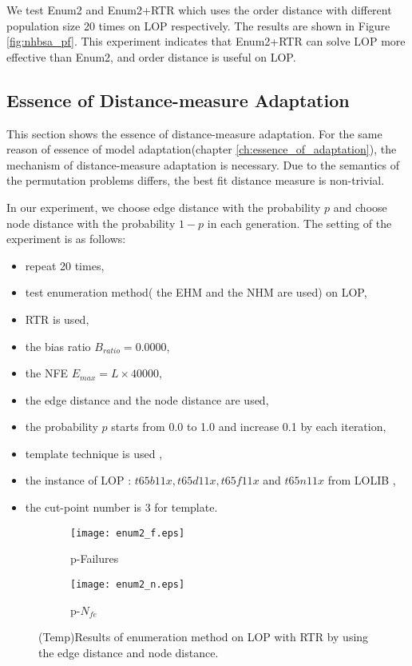 We test Enum2 and Enum2+RTR which uses the order distance with different population size 20 times on LOP respectively. The results are shown in Figure \ref{fig:nhbsa_pf}. This experiment indicates that Enum2+RTR can solve LOP more effective than Enum2, and order distance is useful on LOP.


\subsection{Essence of Distance-measure Adaptation}
This section shows the essence of distance-measure adaptation. For the same reason of essence of model adaptation(chapter \ref{ch:essence_of_adaptation}), the mechanism of distance-measure adaptation is necessary. Due to the semantics of the permutation problems differs, the best fit distance measure is non-trivial.

In our experiment, we choose edge distance with the probability $p$ and choose node distance with the probability $1-p$ in each generation. The setting of the experiment is as follows:
\begin{itemize}
    \item repeat 20 times,
    \item test enumeration method( the EHM and the NHM are used) on LOP,
    \item RTR is used,
    \item the bias ratio $B_{ratio} = 0.0000$,
    \item the NFE $E_{max} = L \times 40000$,
    \item the edge distance and the node distance are used,
    \item the probability $p$ starts from 0.0 to 1.0 and increase 0.1 by each iteration,
    \item template technique is used ,
    \item the instance of LOP : $t65b11x,t65d11x,t65f11x$ and $t65n11x$ from LOLIB ,
    \item the cut-point number is 3 for template.
\end{itemize}


\begin{figure}[htbp] 
        \centering
        \begin{subfigure}{0.49\textwidth}
            \texttt{[image: enum2\_f.eps]}
            \caption{p-Failures} 
        \end{subfigure}
        \begin{subfigure}{0.49\textwidth} 
            \texttt{[image: enum2\_n.eps]}
            \caption{p-$N_{fe}$}
        \end{subfigure}

        \caption{(Temp)Results of enumeration method on LOP with RTR by using the edge distance and node distance.  } 
        \label{fig:enum_pf}
\end{figure}

